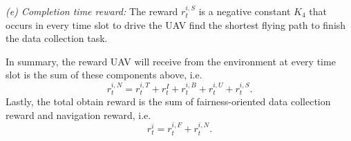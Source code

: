 \documentclass[journal]{IEEEtran}
\begin{document}
\textit{(e) Completion time reward:} The reward $r^{i,S}_{t}$ is a negative constant $K_4$ that occurs in every time slot to drive the UAV find the shortest flying path to finish the data collection task. 

In summary, the reward UAV will receive from the environment at every time slot is the sum of these components above, i.e. 
\begin{equation}\label{reward_nav}
r^{i,N}_{t}=r^{i,T}_{t}+r^{I}_t+r^{i,B}_{t}+r^{i,U}_{t}+r^{i,S}_{t}. 
\end{equation}
Lastly, the total obtain reward is the sum of fairness-oriented data collection reward and navigation reward, i.e. 
\begin{equation}\label{reward_tol}
r^{i}_{t}=r^{i,F}_{t}+r^{i,N}_{t}. 
\end{equation}
\end{document}
